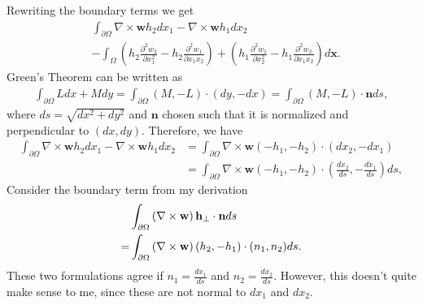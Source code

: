 \documentclass[11pt, a4paper]{article}
\theoremstyle{definition}
\newcommand{\w}{\mathbf{w}}
\newcommand{\x}{\mathbf{x}}
\newcommand{\n}{\mathbf{n}}
\newcommand{\h}{\mathbf{h}}
\begin{document}
	Rewriting the boundary terms we get
	\begin{align*}
		&\int_{\partial \Omega}\nabla \times \w h_2 dx_1 - \nabla \times \w h_1 dx_2\\
		&- \int_\Omega \left(h_2\frac{\partial^2 w_2}{\partial x_1^2} - h_2\frac{\partial^2 w_1}{\partial x_1 x_2} \right) + \left(h_1\frac{\partial^2 w_1}{\partial x_2^2} - h_1\frac{\partial^2 w_2}{\partial x_1 x_2} \right)  d\x.
	\end{align*}
	Green's Theorem can be written as
	\begin{align*}
		\int_{\partial \Omega} Ldx + M dy = \int_{\partial \Omega} \left(M, - L\right) \cdot \left(dy, - dx\right) = \int_{\partial \Omega} \left(M, - L\right) \cdot \n ds,
	\end{align*}
	where $ds = \sqrt{dx^2 + dy^2}$ and $\n$ chosen such that it is normalized and perpendicular to $(dx, dy)$.
	Therefore, we have
	\begin{align*}
		\int_{\partial \Omega}\nabla \times \w h_2 dx_1 - \nabla \times \w h_1 dx_2 &= \int_{\partial \Omega}\nabla \times \w \left(-h_1, - h_2\right)\cdot (dx_2, - dx_1) \\
		&= \int_{\partial \Omega}\nabla \times \w \left(-h_1, - h_2\right) \cdot \left(\frac{dx_2}{ds}, - \frac{dx_1}{ds}\right) ds,
	\end{align*}
	Consider the boundary term from my derivation	
	\begin{align}
		& \int_{\partial \Omega} \left(\nabla \times \w\right) \h_\bot \cdot \n d s\notag\\
		=&  \int_{\partial \Omega} \left(\nabla \times \w\right) \left(h_2, - h_1\right) \cdot (n_1, n_2) d s \label{eq1}.
	\end{align}
	These two formulations agree if $n_1 = \frac{dx_1}{ds}$ and $n_2 = \frac{dx_2}{ds}$. However, this doesn't quite make sense to me, since these are not normal to $dx_1$ and $dx_2$.
\end{document}
